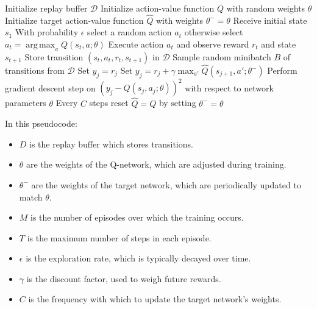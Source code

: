 \documentclass{article}
\DeclareMathOperator*{\argmax}{arg\,max}
\begin{document}
\begin{algorithm}
\caption{Deep Q-Network (DQN)}
\begin{algorithmic}[1]

\State Initialize replay buffer $\mathcal{D}$
\State Initialize action-value function $Q$ with random weights $\theta$
\State Initialize target action-value function $\hat{Q}$ with weights $\theta^- = \theta$
    \State Receive initial state $s_1$
        \State With probability $\epsilon$ select a random action $a_t$
        \State otherwise select $a_t = \argmax_a Q(s_t, a; \theta)$
        \State Execute action $a_t$ and observe reward $r_t$ and state $s_{t+1}$
        \State Store transition $(s_t, a_t, r_t, s_{t+1})$ in $\mathcal{D}$
        \State Sample random minibatch $B$ of transitions from $\mathcal{D}$
                \State Set $y_j = r_j$
            \Else
                \State Set $y_j = r_j + \gamma \max_{a'}\hat{Q}(s_{j+1}, a'; \theta^-)$
            \EndIf
            \State Perform gradient descent step on $(y_j - Q(s_j, a_j; \theta))^2$ with respect to network parameters $\theta$
        \EndFor
        \State Every $C$ steps reset $\hat{Q} = Q$ by setting $\theta^- = \theta$
    \EndFor
\EndFor

\end{algorithmic}
\end{algorithm}

In this pseudocode:
\begin{itemize}
    \item $D$ is the replay buffer which stores transitions.
    \item $\theta$ are the weights of the Q-network, which are adjusted during training.
    \item $\theta^-$ are the weights of the target network, which are periodically updated to match $\theta$.
    \item $M$ is the number of episodes over which the training occurs.
    \item $T$ is the maximum number of steps in each episode.
    \item $\epsilon$ is the exploration rate, which is typically decayed over time.
    \item $\gamma$ is the discount factor, used to weigh future rewards.
    \item $C$ is the frequency with which to update the target network's weights.
\end{itemize}
\end{document}
